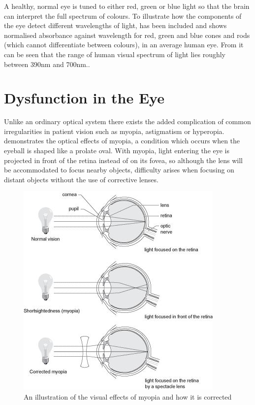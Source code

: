 A healthy, normal eye is tuned to either red, green or blue light so that the
brain can interpret the full spectrum of colours. To illustrate how the
components of the eye detect different wavelengths of light,
 has been included and shows normalised absorbance
against wavelength for red, green and blue cones and rods (which cannot
differentiate between colours), in an average human eye.  From
 it can be seen that the range of human visual spectrum
of light lies roughly between 390nm and 700nm.\cite{starr2010biology}.


\section{Dysfunction in the Eye}

Unlike an ordinary optical system there exists the added complication
of common irregularities in patient vision such as myopia, astigmatism
or hyperopia.  demonstrates the optical effects of myopia,
a condition which occurs when the eyeball is shaped like a prolate oval.
\cite{saine2002ophthalmic} With myopia, light entering the eye is projected
in front of the retina instead of on its fovea, so although the lens will be
accommodated to focus nearby objects, difficulty arises when focusing on 
distant objects without the use of corrective lenses.

\begin{figure}[htbp]
\centering
\includegraphics{figures/myopia}
\caption{An illustration of the visual effects of myopia and how it is corrected}
\label{fig:myop}
\end{figure}

